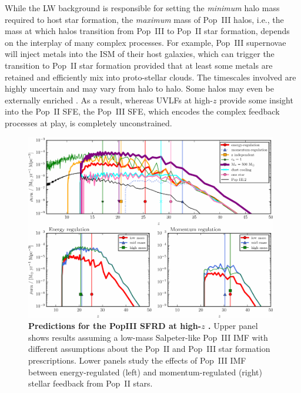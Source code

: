 While the LW background is responsible for setting the \textit{minimum} halo mass required to host star formation, the \textit{maximum} mass of Pop~III halos, i.e., the mass at which halos transition from Pop~III to Pop~II star formation, depends on the interplay of many complex processes. For example, Pop~III supernovae will inject metals into the ISM of their host galaxies, which can trigger the transition to Pop~II star formation provided that at least some metals are retained and efficiently mix into proto-stellar clouds. The timescales involved are highly uncertain and may vary from halo to halo. Some halos may even be externally enriched \cite{Smith2015}. As a result, whereas UVLFs at high-$z$ provide some insight into the Pop~II SFE, the Pop~III SFE, which encodes the complex feedback processes at play, is completely unconstrained. 

\begin{figure}[]
\begin{center}
\includegraphics[width=0.98\textwidth]{Mirocha/mebane2018_fig7.pdf}
\end{center}
\caption{{\bf Predictions for the PopIII SFRD at high-$z$ \cite{Mebane2018}.} Upper panel shows results assuming a low-mass Salpeter-like Pop~III IMF with different assumptions about the Pop~II and Pop~III star formation prescriptions. Lower panels study the effects of Pop~III IMF between energy-regulated (left) and momentum-regulated (right) stellar feedback from Pop~II stars.}
\label{fig:popIII_sfrd}
\end{figure}

